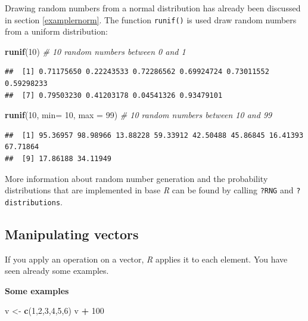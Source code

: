 \documentclass[
]{scrartcl}
\makeatletter
\newenvironment{Shaded}{\begin{snugshade}}{\end{snugshade}}
\newcommand{\AttributeTok}[1]{\textcolor[rgb]{0.13,0.29,0.53}{#1}}
\newcommand{\CommentTok}[1]{\textcolor[rgb]{0.56,0.35,0.01}{\textit{#1}}}
\newcommand{\DecValTok}[1]{\textcolor[rgb]{0.00,0.00,0.81}{#1}}
\newcommand{\FunctionTok}[1]{\textcolor[rgb]{0.13,0.29,0.53}{\textbf{#1}}}
\newcommand{\NormalTok}[1]{#1}
\newcommand{\OtherTok}[1]{\textcolor[rgb]{0.56,0.35,0.01}{#1}}
\newcommand{\SpecialCharTok}[1]{\textcolor[rgb]{0.81,0.36,0.00}{\textbf{#1}}}
\newenvironment{kframe}{%
\medskip{}
\setlength{\fboxsep}{.8em}
 \def\at@end@of@kframe{}%
 \ifinner\ifhmode%
  \def\at@end@of@kframe{\end{minipage}}%
  \begin{minipage}{\columnwidth}%
 \fi\fi%
 \def\FrameCommand##1{\hskip\@totalleftmargin \hskip-\fboxsep
 \colorbox{shadecolor}{##1}\hskip-\fboxsep
     \hskip-\linewidth \hskip-\@totalleftmargin \hskip\columnwidth}%
 \MakeFramed {\advance\hsize-\width
   \@totalleftmargin\z@ \linewidth\hsize
   \@setminipage}}%
 {\par\unskip\endMakeFramed%
 \at@end@of@kframe}
\newenvironment{rmdblock}[1]
  {
  \begin{itemize}
  \renewcommand{\labelitemi}{
    \raisebox{-.7\height}[0pt][0pt]{
      {\setkeys{Gin}{width=3em,keepaspectratio}\texttt{[image: images/\#1]}}
    }
  }
  \setlength{\fboxsep}{1em}
  \begin{kframe}
  \item
  }
  {
  \end{kframe}
  \end{itemize}
  }
\newenvironment{geek}
    {\begin{rmdblock}{geek}}
    {\end{rmdblock}}
\newenvironment{webexsolution}[1]
    {\par\tiny\textbf{#1}}
    {\par}
\newcommand{\webexhide}[1]{\begin{webexsolution}{#1}}
\makeatother
\begin{document}
Drawing random numbers from a normal distribution has already been discussed in section \ref{examplernorm}. The function \texttt{runif()} is used draw random numbers from a uniform distribution:

\begin{Shaded}
\begin{Highlighting}[]
\FunctionTok{runif}\NormalTok{(}\DecValTok{10}\NormalTok{)                     }\CommentTok{\# 10 random numbers between 0 and 1}
\end{Highlighting}
\end{Shaded}

\begin{verbatim}
##  [1] 0.71175650 0.22243533 0.72286562 0.69924724 0.73011552 0.59298233
##  [7] 0.79503230 0.41203178 0.04541326 0.93479101
\end{verbatim}

\begin{Shaded}
\begin{Highlighting}[]
\FunctionTok{runif}\NormalTok{(}\DecValTok{10}\NormalTok{, }\AttributeTok{min=} \DecValTok{10}\NormalTok{, }\AttributeTok{max =} \DecValTok{99}\NormalTok{)  }\CommentTok{\# 10 random numbers between 10 and 99}
\end{Highlighting}
\end{Shaded}

\begin{verbatim}
##  [1] 95.36957 98.98966 13.88228 59.33912 42.50488 45.86845 16.41393 67.71864
##  [9] 17.86188 34.11949
\end{verbatim}

\begin{geek}
More information about random number generation and the probability
distributions that are implemented in base \emph{R} can be found by
calling \texttt{?RNG} and \texttt{?distributions}.
\end{geek}

\hypertarget{manipulating-vectors}{%
\subsection{Manipulating vectors}\label{manipulating-vectors}}

If you apply an operation on a vector, \emph{R} applies it to each element. You have seen already some examples.

\webexhide{Some examples}

\begin{Shaded}
\begin{Highlighting}[]
\NormalTok{v }\OtherTok{\textless{}{-}} \FunctionTok{c}\NormalTok{(}\DecValTok{1}\NormalTok{,}\DecValTok{2}\NormalTok{,}\DecValTok{3}\NormalTok{,}\DecValTok{4}\NormalTok{,}\DecValTok{5}\NormalTok{,}\DecValTok{6}\NormalTok{)}
\NormalTok{v }\SpecialCharTok{+} \DecValTok{100}
\end{Highlighting}
\end{Shaded}
\end{document}
